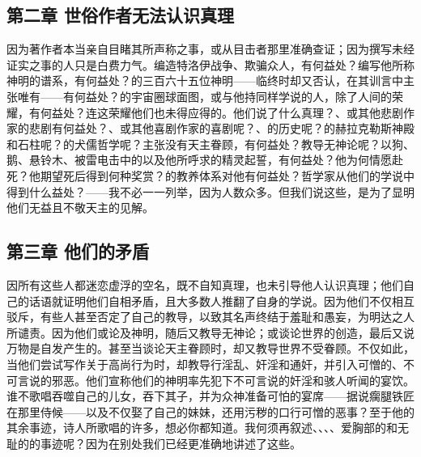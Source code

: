 
\subsection{第二章 世俗作者无法认识真理}

因为著作者本当亲自目睹其所声称之事，或从目击者那里准确查证；因为撰写未经证实之事的人只是白费力气。编造特洛伊战争、欺骗众人，有何益处？编写他所称神明的谱系，有何益处？的三百六十五位神明——临终时却又否认，在其训言中主张唯有——有何益处？的宇宙圈球面图，或与他持同样学说的人，除了人间的荣耀，有何益处？连这荣耀他们也未得应得的。他们说了什么真理？、或其他悲剧作家的悲剧有何益处？、或其他喜剧作家的喜剧呢？、的历史呢？的赫拉克勒斯神殿和石柱呢？的犬儒哲学呢？主张没有天主眷顾，有何益处？教导无神论呢？以狗、鹅、悬铃木、被雷电击中的以及他所呼求的精灵起誓，有何益处？他为何情愿赴死？他期望死后得到何种奖赏？的教养体系对他有何益处？哲学家从他们的学说中得到什么益处？——我不必一一列举，因为人数众多。但我们说这些，是为了显明他们无益且不敬天主的见解。\par


\subsection{第三章 他们的矛盾}

因所有这些人都迷恋虚浮的空名，既不自知真理，也未引导他人认识真理；他们自己的话语就证明他们自相矛盾，且大多数人推翻了自身的学说。因为他们不仅相互驳斥，有些人甚至否定了自己的教导，以致其名声终结于羞耻和愚妄，为明达之人所谴责。因为他们或论及神明，随后又教导无神论；或谈论世界的创造，最后又说万物是自发产生的。甚至当谈论天主眷顾时，却又教导世界不受眷顾。不仅如此，当他们尝试写作关于高尚行为时，却教导行淫乱、奸淫和通奸，并引入可憎的、不可言说的邪恶。他们宣称他们的神明率先犯下不可言说的奸淫和骇人听闻的宴饮。谁不歌唱吞噬自己的儿女，吞下其子，并为众神准备可怕的宴席——据说瘸腿铁匠在那里侍候——以及不仅娶了自己的妹妹，还用污秽的口行可憎的恶事？至于他的其余事迹，诗人所歌唱的许多，想必你都知道。我何须再叙述、、、、爱胸部的和无耻的的事迹呢？因为在别处我们已经更准确地讲述了这些。\par

